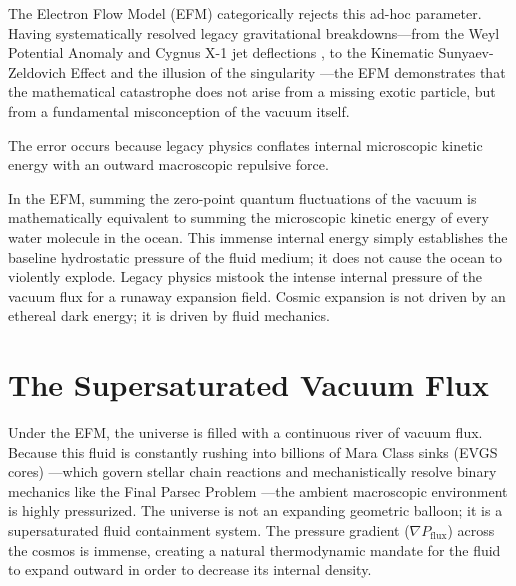 \documentclass[11pt, a4paper, table]{article}
\begin{document}
  The Electron Flow Model (EFM) \cite{marabut2026m1} categorically rejects this ad-hoc parameter. Having systematically resolved legacy gravitational breakdowns---from the Weyl Potential Anomaly \cite{marabut2026m2} and Cygnus X-1 jet deflections \cite{marabut2026m3}, to the Kinematic Sunyaev-Zeldovich Effect \cite{marabut2026m7} and the illusion of the singularity \cite{marabut2026m10}---the EFM demonstrates that the mathematical catastrophe does not arise from a missing exotic particle, but from a fundamental misconception of the vacuum itself. 
  
  \clearpage
  The error occurs because legacy physics conflates internal microscopic kinetic energy with an outward macroscopic repulsive force. 
  
  In the EFM, summing the zero-point quantum fluctuations of the vacuum is mathematically equivalent to summing the microscopic kinetic energy of every water molecule in the ocean. This immense internal energy simply establishes the baseline hydrostatic pressure of the fluid medium; it does not cause the ocean to violently explode. Legacy physics mistook the intense internal pressure of the vacuum flux for a runaway expansion field. Cosmic expansion is not driven by an ethereal dark energy; it is driven by fluid mechanics.

\section{The Supersaturated Vacuum Flux}
  Under the EFM, the universe is filled with a continuous river of vacuum flux. Because this fluid is constantly rushing into billions of Mara Class sinks (EVGS cores) \cite{marabut2026m8}---which govern stellar chain reactions \cite{marabut2026m4} and mechanistically resolve binary mechanics like the Final Parsec Problem \cite{marabut2026m9}---the ambient macroscopic environment is highly pressurized. The universe is not an expanding geometric balloon; it is a supersaturated fluid containment system. The pressure gradient ($\nabla P_{\text{flux}}$) across the cosmos is immense, creating a natural thermodynamic mandate for the fluid to expand outward in order to decrease its internal density.

\end{document}
